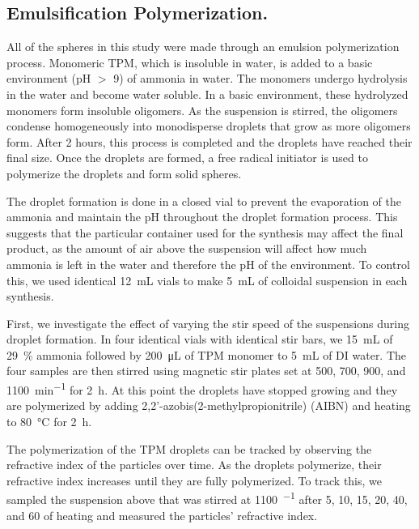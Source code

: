 \subsection{Emulsification Polymerization.}

All of the spheres in this study were made through an emulsion 
polymerization process. Monomeric TPM, which is insoluble in water, 
is added to a basic environment (pH $>$ \num{9}) of ammonia in water. The 
monomers undergo hydrolysis in the water and become water soluble. 
In a basic environment, these hydrolyzed monomers form insoluble 
oligomers. As the suspension is stirred, the oligomers condense 
homogeneously into monodisperse droplets that grow as more oligomers 
form. After \num{2} hours, this process is completed and the droplets have 
reached their final size. Once the droplets are formed, a free radical 
initiator is used to polymerize the droplets and form solid spheres.

The droplet formation is done in a closed vial to prevent the 
evaporation of the ammonia and maintain the pH throughout the droplet 
formation process. This suggests that the particular container used for 
the synthesis may affect the final product, as the amount of air above 
the suspension will affect how much ammonia is left in the water and 
therefore the pH of the environment. To control this, we used identical 
\SI{12}{\milli\liter} vials to make \SI{5}{\milli\liter} of colloidal 
suspension in each synthesis.

First, we investigate the effect of varying the stir speed of the 
suspensions during droplet formation. In four identical vials with 
identical stir bars, we \SI{15}{\milli\liter} of 
\SI{29}{\percent} ammonia followed by \SI{200}{\micro\liter} of TPM 
monomer to \SI{5}{\milli\liter} of DI water. The four samples are then stirred 
using magnetic stir plates set at \num{500}, \num{700}, \num{900}, and \SI{1100}{\minute^{-1}} for \SI{2}{\hour}. %
At this point the droplets have stopped growing and they are polymerized 
by adding \num{2},\num{2}'-azobis(\num{2}-methylpropionitrile) (AIBN) and 
heating to \SI{80}{\celsius} for \SI{2}{\hour}. 

The polymerization of the TPM droplets can be tracked by observing the 
refractive index of the particles over time. As the droplets polymerize, 
their refractive index increases until they are fully polymerized. To track 
this, we sampled the suspension above that was stirred at \SI{1100}{\min^{-1}}
after \si{5}, \si{10}, \si{15}, \si{20}, \si{40}, and \SI{60}{\min} of 
heating and measured the particles' refractive index. 

